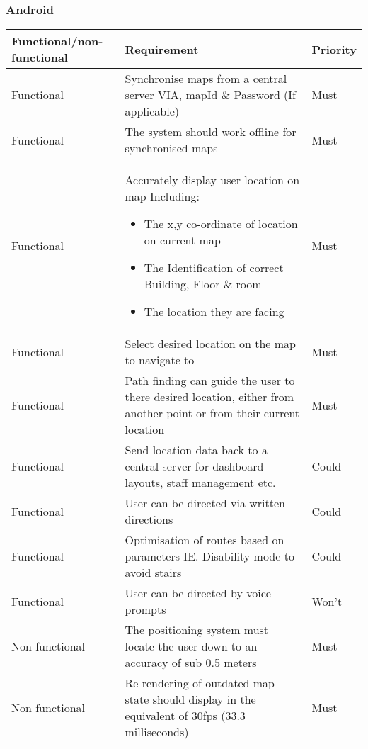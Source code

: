 \subsubsection{Android}
\begin{tabular}{| p{} | p{} | p{}|}
	\hline
	Functional/non-functional & Requirement & Priority\\\hline
	Functional & Synchronise maps from a central server VIA, mapId \& Password (If applicable)& Must\\\hline
	Functional & The system should work offline for synchronised maps & Must\\\hline
	Functional & 
		Accurately display user location on map Including:
			\begin{itemize}
				\item The x,y co-ordinate of location on current map
				\item The Identification of correct Building, Floor \& room
				\item The location they are facing
			\end{itemize}
	 & Must\\\hline
	Functional & Select desired location on the map to navigate to & Must\\\hline
	Functional & Path finding can guide the user to there desired location, either from another point or from their current location & Must\\\hline
	Functional & Send location data back to a central server for dashboard layouts, staff management etc. & Could\\\hline
	Functional & User can be directed via written directions & Could\\\hline
	Functional & Optimisation of routes based on parameters IE. Disability mode to avoid stairs & Could\\\hline
	Functional & User can be directed by voice prompts & Won't\\\hline
	Non functional & The positioning system must locate the user down to an accuracy of sub 0.5 meters & Must\\\hline
	Non functional & Re-rendering of outdated map state should display in the equivalent of 30fps (33.3 milliseconds) & Must\\\hline

\end{tabular}


